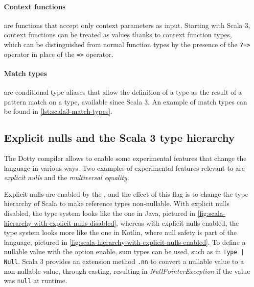 \paragraph{Context functions} are functions that accept only context parameters as input. Starting with Scala 3, context functions can be treated as values thanks to context function types, which can be distinguished from normal function types by the presence of the \texttt{?=>} operator in place of the \texttt{=>} operator.

\paragraph{Match types} are conditional type aliases that allow the definition of a type as the result of a pattern match on a type, available since Scala 3.
%
An example of match types can be found in \cref{lst:scala3-match-types}.




\subsection{Explicit nulls and the Scala 3 type hierarchy} \label{chap:background->sec:scala3->subsec:type-hierarchy} \label{chap:background->sec:scala3->subsec:explicit-nulls}

The Dotty compiler allows to enable some experimental features that change the language in various ways.
%
Two examples of experimental features relevant to \this are \textit{explicit nulls} and the \textit{multiversal equality}.

Explicit nulls are enabled by the , and the effect of this flag is to change the type hierarchy of Scala to make reference types non-nullable.
%
With explicit nulls disabled, the type system looks like the one in Java, pictured in \cref{fig:scala-hierarchy-with-explicit-nulls-disabled}, whereas with explicit nulls enabled, the type system looks more like the one in Kotlin, where null safety is part of the language, pictured in \cref{fig:scala-hierarchy-with-explicit-nulls-enabled}.
%
To define a nullable value with the option enable, sum types can be used, such as in \texttt{Type | Null}.
%
Scala 3 provides an extension method \texttt{.nn} to convert a nullable value to a non-nullable value, through casting, resulting in \textit{NullPointerException} if the value was \texttt{null} at runtime.

